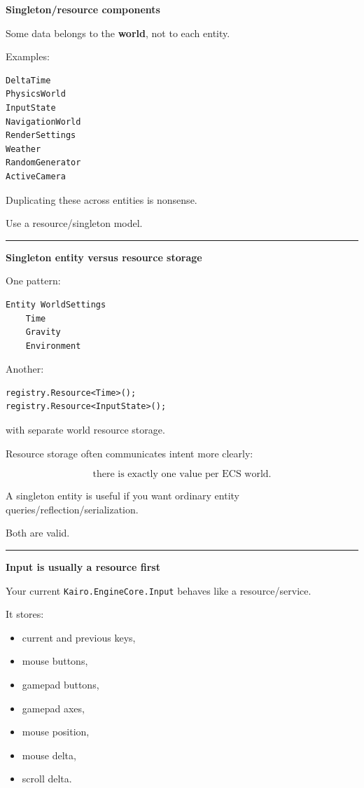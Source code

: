 \textbf{Singleton/resource components}

Some data belongs to the \textbf{world}, not to each entity.

Examples:

\begin{verbatim}
DeltaTime
PhysicsWorld
InputState
NavigationWorld
RenderSettings
Weather
RandomGenerator
ActiveCamera
\end{verbatim}

Duplicating these across entities is nonsense.

Use a resource/singleton model.

\begin{center}\rule{0.5\linewidth}{0.5pt}\end{center}

\textbf{Singleton entity versus resource storage}

One pattern:

\begin{verbatim}
Entity WorldSettings
    Time
    Gravity
    Environment
\end{verbatim}

Another:

\begin{verbatim}
registry.Resource<Time>();
registry.Resource<InputState>();
\end{verbatim}

with separate world resource storage.

Resource storage often communicates intent more clearly:

\[
\boxed{
\text{there is exactly one value per ECS world}.
}
\]

A singleton entity is useful if you want ordinary entity queries/reflection/serialization.

Both are valid.

\begin{center}\rule{0.5\linewidth}{0.5pt}\end{center}

\textbf{Input is usually a resource first}

Your current \texttt{Kairo.EngineCore.Input} behaves like a resource/service.

It stores:

\begin{itemize}
\tightlist
\item
  current and previous keys,
\item
  mouse buttons,
\item
  gamepad buttons,
\item
  gamepad axes,
\item
  mouse position,
\item
  mouse delta,
\item
  scroll delta.
\end{itemize}

